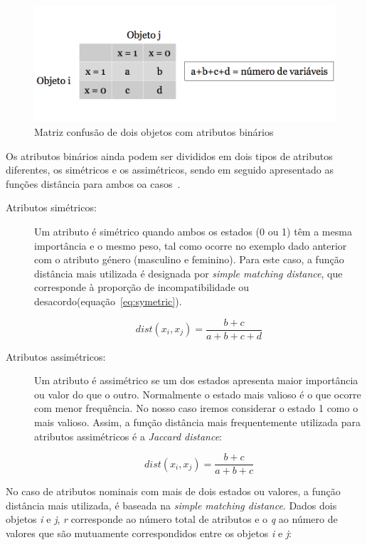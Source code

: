 \begin{figure}[h]
\centering
\includegraphics[width=0.8\linewidth]{./figures/matriz_confusao}
\caption{Matriz confusão de dois objetos com atributos binários}
\label{fig:matriz_confusão}
\end{figure}

Os atributos binários ainda podem ser divididos em dois tipos de atributos diferentes, os simétricos e os assimétricos, sendo em seguido apresentado as funções distância para ambos oa casos~\citet{Liu2011}.

\begin{description}
\item[Atributos simétricos: ] Um atributo é simétrico quando ambos os estados (0 ou 1) têm a mesma importância e o mesmo peso, tal como ocorre no exemplo dado anterior com o atributo género (masculino e feminino). Para este caso, a função distância mais utilizada é designada por \textit{simple matching distance}, que corresponde à proporção de incompatibilidade ou desacordo(equação~\ref{eq:symetric}).  

\begin{equation}
 dist(x_{i}, x_{j}) =  \frac{b + c}{a + b + c + d}
 \label{eq:symetric}   
\end{equation}

\item[Atributos assimétricos: ] Um atributo é assimétrico se um dos estados apresenta maior importância ou valor do que o outro. Normalmente o estado mais valioso é o que ocorre com menor frequência. No nosso caso iremos considerar o estado 1 como o mais valioso. Assim, a função distância mais frequentemente utilizada para atributos assimétricos é a \textit{Jaccard distance}:

\begin{equation}
 dist(x_{i}, x_{j}) =  \frac{b + c}{a + b + c}
\label{eq:asymetric}   
\end{equation}

\end{description}

No caso de atributos nominais com mais de dois estados ou valores, a função distância mais utilizada, é baseada na \textit{simple matching distance}. Dados dois objetos \textit{i} e \textit{j}, \textit{r} corresponde ao número total de atributos e o \textit{q} ao número de valores que são mutuamente correspondidos entre os objetos \textit{i} e \textit{j}:

